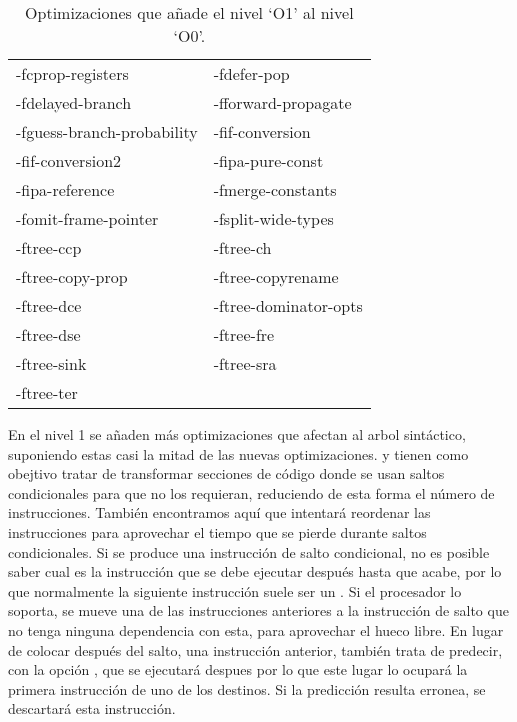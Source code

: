\begin{table}[H]
\begin{center}
	\begin{tabular}{|ll|}
		\hline
		-fcprop-registers & -fdefer-pop\\
		-fdelayed-branch & -fforward-propagate\\
		-fguess-branch-probability &-fif-conversion\\
		-fif-conversion2 & -fipa-pure-const\\
		-fipa-reference & -fmerge-constants\\
		-fomit-frame-pointer & -fsplit-wide-types\\
		-ftree-ccp & -ftree-ch\\
		-ftree-copy-prop & -ftree-copyrename\\
		-ftree-dce & -ftree-dominator-opts\\
		-ftree-dse & -ftree-fre\\
		-ftree-sink & -ftree-sra\\
		-ftree-ter & \\
		\hline
	\end{tabular}
\end{center}
\caption{Optimizaciones que añade el nivel `O1' al nivel `O0'.}
\label{optimizaciones1}
\end{table}

En el nivel 1 se añaden más optimizaciones que afectan al arbol sintáctico, suponiendo estas casi la mitad de las nuevas optimizaciones.  y  tienen como obejtivo tratar de transformar secciones de código donde se usan saltos condicionales para que no los requieran, reduciendo de esta forma el número de instrucciones. También encontramos aquí  que intentará reordenar las instrucciones para aprovechar el tiempo que se pierde durante saltos condicionales. Si se produce una instrucción de salto condicional, no es posible saber cual es la instrucción que se debe ejecutar después hasta que acabe, por lo que normalmente la siguiente instrucción suele ser un . Si el procesador lo soporta, se mueve una de las instrucciones anteriores a la instrucción de salto que no tenga ninguna dependencia con esta, para aprovechar el hueco libre. En lugar de colocar después del salto, una instrucción anterior,  también trata de predecir, con la opción , que se ejecutará despues por lo que este lugar lo ocupará la primera instrucción de uno de los destinos. Si la predicción resulta erronea, se descartará esta instrucción.

